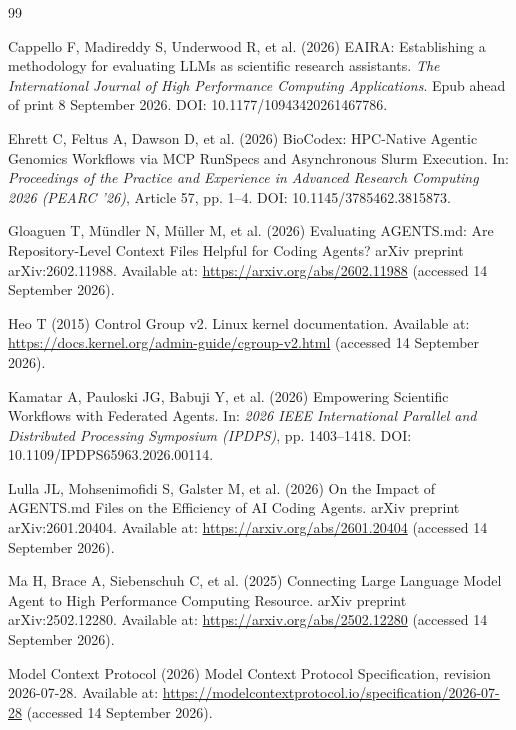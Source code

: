 \documentclass[11pt]{article}
\begin{document}
\begin{thebibliography}{99}

Cappello F, Madireddy S, Underwood R, et al. (2026) EAIRA: Establishing a methodology for evaluating LLMs as scientific research assistants. \textit{The International Journal of High Performance Computing Applications}. Epub ahead of print 8 September 2026. DOI: 10.1177/10943420261467786.

Ehrett C, Feltus A, Dawson D, et al. (2026) BioCodex: HPC-Native Agentic Genomics Workflows via MCP RunSpecs and Asynchronous Slurm Execution. In: \textit{Proceedings of the Practice and Experience in Advanced Research Computing 2026 (PEARC '26)}, Article 57, pp. 1--4. DOI: 10.1145/3785462.3815873.

Gloaguen T, Mündler N, Müller M, et al. (2026) Evaluating AGENTS.md: Are Repository-Level Context Files Helpful for Coding Agents? arXiv preprint arXiv:2602.11988. Available at: \url{https://arxiv.org/abs/2602.11988} (accessed 14 September 2026).

Heo T (2015) Control Group v2. Linux kernel documentation. Available at: \url{https://docs.kernel.org/admin-guide/cgroup-v2.html} (accessed 14 September 2026).

Kamatar A, Pauloski JG, Babuji Y, et al. (2026) Empowering Scientific Workflows with Federated Agents. In: \textit{2026 IEEE International Parallel and Distributed Processing Symposium (IPDPS)}, pp. 1403--1418. DOI: 10.1109/IPDPS65963.2026.00114.

Lulla JL, Mohsenimofidi S, Galster M, et al. (2026) On the Impact of AGENTS.md Files on the Efficiency of AI Coding Agents. arXiv preprint arXiv:2601.20404. Available at: \url{https://arxiv.org/abs/2601.20404} (accessed 14 September 2026).

Ma H, Brace A, Siebenschuh C, et al. (2025) Connecting Large Language Model Agent to High Performance Computing Resource. arXiv preprint arXiv:2502.12280. Available at: \url{https://arxiv.org/abs/2502.12280} (accessed 14 September 2026).

Model Context Protocol (2026) Model Context Protocol Specification, revision 2026-07-28. Available at: \url{https://modelcontextprotocol.io/specification/2026-07-28} (accessed 14 September 2026).


\end{thebibliography}
\end{document}

